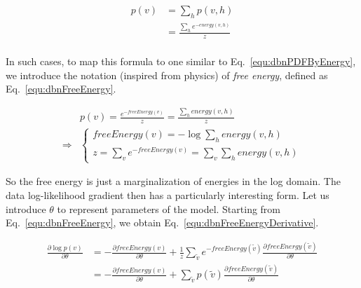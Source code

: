 \documentclass[runningheads,openany]{xhlPaper}
\begin{document}
\begin{equation}
\label{equ:dbnMarginalPFOfVisible}
\begin{aligned}
p\left( v \right) &= \sum\limits_h {p\left( {v,h} \right)} \\
 &= \frac{{\sum\limits_h {{e^{ - energy\left( {v,h} \right)}}} }}{z}\\
\end{aligned}
\end{equation}

In such cases, to map this formula to one similar to Eq.~\ref{equ:dbnPDFByEnergy}, we introduce the notation (inspired from physics) of \emph{free energy}, defined as Eq.~\ref{equ:dbnFreeEnergy}.

\begin{equation}
\label{equ:dbnFreeEnergy}
\begin{aligned}
&p\left( v \right) = \frac{{{e^{ - freeEnergy\left( v \right)}}}}{z} = \frac{{\sum\limits_h {energy\left( {v,h} \right)} }}{z}\\
 \Rightarrow& \left\{ {\begin{array}{*{20}{c}}
{freeEnergy\left( v \right) =  - \log \sum\limits_h {energy\left( {v,h} \right)} }\\
{z = \sum\limits_v {{e^{ - freeEnergy\left( v \right)}}}  = \sum\limits_v {\sum\limits_h {energy\left( {v,h} \right)} } }
\end{array}} \right.
\end{aligned}
\end{equation}

So the free energy is just a marginalization of energies in the log domain. The data log-likelihood gradient then has a particularly interesting form. Let us introduce $\theta$ to represent parameters of the model. Starting from Eq.~\ref{equ:dbnFreeEnergy}, we obtain Eq.~\ref{equ:dbnFreeEnergyDerivative}.

\begin{equation}
\label{equ:dbnFreeEnergyDerivative}
\begin{aligned}
\frac{{\partial \log p\left( v \right)}}{{\partial \theta }} &=  - \frac{{\partial freeEnergy\left( v \right)}}{{\partial \theta }} + \frac{1}{z}\sum\limits_{\tilde v} {{e^{ - freeEnergy\left( {\tilde v} \right)}}\frac{{\partial freeEnergy\left( {\tilde v} \right)}}{{\partial \theta }}} \\
 &=  - \frac{{\partial freeEnergy\left( v \right)}}{{\partial \theta }} + \sum\limits_{\tilde v} {p\left( {\tilde v} \right)\frac{{\partial freeEnergy\left( {\tilde v} \right)}}{{\partial \theta }}} 
\end{aligned}
\end{equation} 
\end{document}
